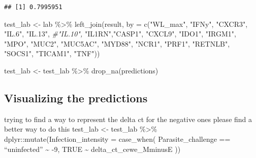 \documentclass[
]{article}
\newenvironment{Shaded}{\begin{snugshade}}{\end{snugshade}}
\newcommand{\AttributeTok}[1]{\textcolor[rgb]{0.77,0.63,0.00}{#1}}
\newcommand{\CommentTok}[1]{\textcolor[rgb]{0.56,0.35,0.01}{\textit{#1}}}
\newcommand{\FunctionTok}[1]{\textcolor[rgb]{0.00,0.00,0.00}{#1}}
\newcommand{\NormalTok}[1]{#1}
\newcommand{\OtherTok}[1]{\textcolor[rgb]{0.56,0.35,0.01}{#1}}
\newcommand{\SpecialCharTok}[1]{\textcolor[rgb]{0.00,0.00,0.00}{#1}}
\newcommand{\StringTok}[1]{\textcolor[rgb]{0.31,0.60,0.02}{#1}}
\begin{document}
\begin{verbatim}
## [1] 0.7995951
\end{verbatim}

\begin{Shaded}
\begin{Highlighting}[]
\NormalTok{test\_lab }\OtherTok{\textless{}{-}}\NormalTok{ lab }\SpecialCharTok{\%\textgreater{}\%}
  \FunctionTok{left\_join}\NormalTok{(result, }\AttributeTok{by =} \FunctionTok{c}\NormalTok{(}\StringTok{"WL\_max"}\NormalTok{, }\StringTok{"IFNy"}\NormalTok{, }\StringTok{"CXCR3"}\NormalTok{, }\StringTok{"IL.6"}\NormalTok{, }\StringTok{"IL.13"}\NormalTok{, }\CommentTok{\#"IL.10",}
                \StringTok{"IL1RN"}\NormalTok{,}\StringTok{"CASP1"}\NormalTok{, }\StringTok{"CXCL9"}\NormalTok{, }\StringTok{"IDO1"}\NormalTok{, }\StringTok{"IRGM1"}\NormalTok{, }\StringTok{"MPO"}\NormalTok{, }
                \StringTok{"MUC2"}\NormalTok{, }\StringTok{"MUC5AC"}\NormalTok{, }\StringTok{"MYD88"}\NormalTok{, }\StringTok{"NCR1"}\NormalTok{, }\StringTok{"PRF1"}\NormalTok{, }\StringTok{"RETNLB"}\NormalTok{, }\StringTok{"SOCS1"}\NormalTok{, }
                \StringTok{"TICAM1"}\NormalTok{, }\StringTok{"TNF"}\NormalTok{))}

\NormalTok{test\_lab }\OtherTok{\textless{}{-}}\NormalTok{ test\_lab }\SpecialCharTok{\%\textgreater{}\%}
  \FunctionTok{drop\_na}\NormalTok{(predictions)}
\end{Highlighting}
\end{Shaded}

\hypertarget{visualizing-the-predictions}{%
\subsection{Visualizing the
predictions}\label{visualizing-the-predictions}}

trying to find a way to represent the delta ct for the negative ones
please find a better way to do this test\_lab \textless- test\_lab
\%\textgreater\% dplyr::mutate(Infection\_intensity = case\_when(
Parasite\_challenge == ``uninfected'' \textasciitilde{} -9, TRUE
\textasciitilde{} delta\_ct\_cewe\_MminusE ))

\begin{Shaded}
\end{Shaded}
\end{document}
